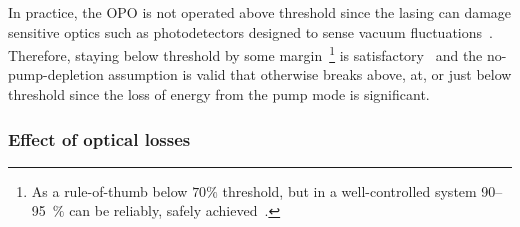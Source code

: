 In practice, the OPO is not operated above threshold since the lasing can damage sensitive optics such as photodetectors designed to sense vacuum fluctuations~\cite{}. Therefore, staying below threshold by some margin~\footnote{As a rule-of-thumb below $70\%$ threshold, but in a well-controlled system 90--95~$\%$ can be reliably, safely achieved~\cite{}.} is satisfactory~\cite{} and the no-pump-depletion assumption is valid that otherwise breaks above, at, or just below threshold since the loss of energy from the pump mode is significant.



\subsubsection{Effect of optical losses}




